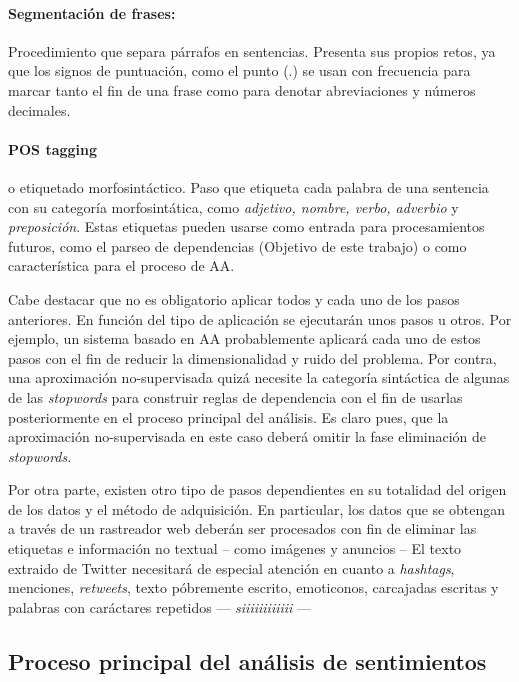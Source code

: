 \paragraph{Segmentación de frases:}Procedimiento que separa párrafos en
sentencias. Presenta sus propios retos, ya que los signos de puntuación, como el
punto (.) se usan con frecuencia para marcar tanto el fin de una frase como para
denotar abreviaciones y números decimales.

\paragraph{POS tagging} o etiquetado morfosintáctico. Paso que etiqueta cada
palabra de una sentencia con su categoría morfosintática, como \emph{adjetivo,
  nombre, verbo, adverbio} y \emph{preposición}. Estas etiquetas pueden usarse
como entrada para procesamientos futuros, como el parseo de dependencias
(Objetivo de este trabajo) o como característica para el proceso de \ac{AA}.

Cabe destacar que no es obligatorio aplicar todos y cada uno de los pasos
anteriores. En función del tipo de aplicación se ejecutarán unos pasos u
otros. Por ejemplo, un sistema basado en \ac{AA} probablemente aplicará cada uno
de estos pasos con el fin de reducir la dimensionalidad y ruido del
problema. Por contra, una aproximación no-supervisada quizá necesite la
categoría sintáctica de algunas de las \emph{stopwords} para construir reglas de
dependencia con el fin de usarlas posteriormente en el proceso principal del
análisis. Es claro pues, que la aproximación no-supervisada en este caso deberá
omitir la fase eliminación de \emph{stopwords}.

Por otra parte, existen otro tipo de pasos dependientes en su totalidad del
origen de los datos y el método de adquisición. En particular, los datos que se
obtengan a través de un rastreador web deberán ser procesados con fin de
eliminar las etiquetas  e información no textual -- como
imágenes y anuncios -- El texto extraido de Twitter necesitará de especial
atención en cuanto a \emph{hashtags}, menciones, \emph{retweets}, texto
póbremente escrito, emoticonos, carcajadas escritas y palabras con caráctares
repetidos --- \emph{siiiiiiiiiiii} ---

\subsection{Proceso principal del análisis de sentimientos}
\label{sec:omcore}

